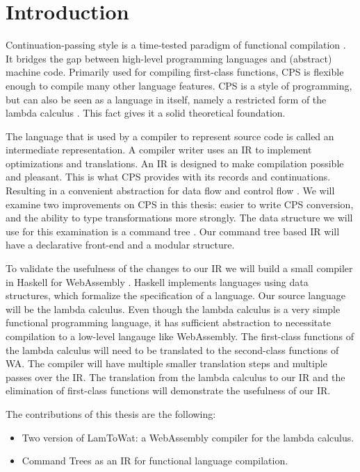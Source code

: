 
\chapter{\label{chap:introduction}Introduction}

Continuation-passing style is a time-tested paradigm of functional compilation \autocite{steele1978rabbit, DBLP:books/daglib/0022396}. It bridges the gap between high-level programming languages and (abstract) machine code. Primarily used for compiling first-class functions, CPS is flexible enough to compile many other language features. CPS is a style of programming, but can also be seen as a language in itself, namely a restricted form of the lambda calculus \autocite{barendregt1984lambda}. This fact gives it a solid theoretical foundation.

The language that is used by a compiler to represent source code is called an intermediate representation. A compiler writer uses an IR to implement optimizations and translations. An IR is designed to make compilation possible and pleasant. This is what CPS provides with its records and continuations. Resulting in a convenient abstraction for data flow and control flow \autocite{bruin2020framevm}. We will examine two improvements on CPS in this thesis: easier to write CPS conversion, and the ability to type transformations more strongly. The data structure we will use for this examination is a command tree \autocite{commandtreespoulsen}. Our command tree based IR will have a declarative front-end and a modular structure.

To validate the usefulness of the changes to our IR we will build a small compiler in Haskell \autocite{haskellhomepage} for WebAssembly \autocite{webassemblyhomepage}. Haskell implements languages using data structures, which formalize the specification of a language. Our source language will be the lambda calculus. Even though the lambda calculus is a very simple functional programming language, it has sufficient abstraction to necessitate compilation to a low-level langauge like WebAssembly. The first-class functions of the lambda calculus will need to be translated to the second-class functions of WA. The compiler will have multiple smaller translation steps and multiple passes over the IR. The translation from the lambda calculus to our IR and the elimination of first-class functions will demonstrate the usefulness of our IR.

The contributions of this thesis are the following:
\begin{itemize}
\item Two version of LamToWat: a WebAssembly compiler for the lambda calculus.
\item Command Trees as an IR for functional language compilation.
\end{itemize}

